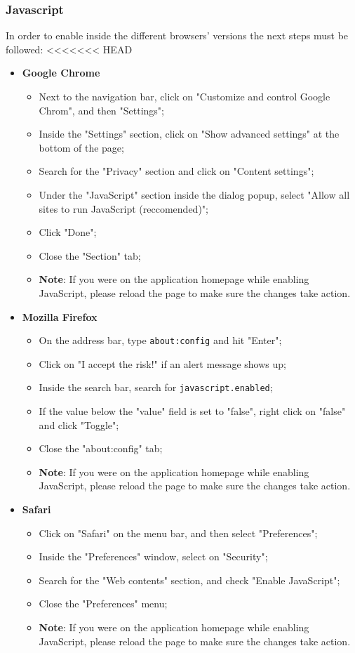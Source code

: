 \subsubsection{Javascript}
In order to enable  inside the different browsers' versions the next steps must be followed:
<<<<<<< HEAD
\begin{itemize}
	\item \textbf{Google Chrome}
		\begin{itemize}
			\item Next to the navigation bar, click on "Customize and control Google Chrom", and then "Settings";
			\item Inside the "Settings" section, click on "Show advanced settings" at the bottom of the page;
			\item Search for the "Privacy" section and click on "Content settings";
			\item Under the "JavaScript" section inside the dialog popup, select "Allow all sites to run JavaScript (reccomended)";
			\item Click "Done";
			\item Close the "Section" tab;
			\item \textbf{Note}: If you were on the application homepage while enabling JavaScript, please reload the page to make sure the changes take action.
		\end{itemize}
		
	\item \textbf{Mozilla Firefox}
		\begin{itemize}
			\item On the address bar, type \texttt{about:config} and hit "Enter";
			\item Click on "I accept the risk!" if an alert message shows up;
			\item Inside the search bar, search for \texttt{javascript.enabled};
			\item If the value below the "value" field is set to "false", right click on "false" and click "Toggle";
			\item Close the "about:config" tab;
			\item \textbf{Note}: If you were on the application homepage while enabling JavaScript, please reload the page to make sure the changes take action.
		\end{itemize}
		
	\item \textbf{Safari}
		\begin{itemize}
			\item Click on "Safari" on the menu bar, and then select "Preferences";
			\item Inside the "Preferences" window, select on "Security";
			\item Search for the "Web contents" section, and check "Enable JavaScript"; 
			\item Close the "Preferences" menu;
			\item \textbf{Note}: If you were on the application homepage while enabling JavaScript, please reload the page to make sure the changes take action.
		\end{itemize}
\end{itemize}
